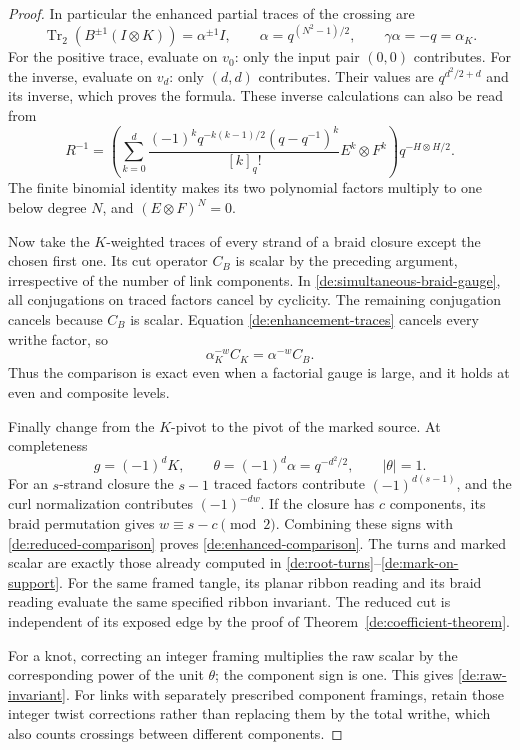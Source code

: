 \begin{proof}
In particular the enhanced partial traces of the crossing are
\begin{equation}\label{de:enhancement-traces}
 \operatorname{Tr}_2(B^{\pm1}(I\otimes K))
       =\alpha^{\pm1}I,\qquad
 \alpha=q^{(N^2-1)/2},\qquad \gamma\alpha=-q=\alpha_K.
\end{equation}
For the positive trace, evaluate on \(v_0\): only the input
pair \((0,0)\) contributes. For the inverse, evaluate on
\(v_d\): only \((d,d)\) contributes. Their values are
\(q^{d^2/2+d}\) and its inverse, which proves the formula.
These inverse calculations can also be read from
\[
 R^{-1}=
 \left(\sum_{k=0}^d
   \frac{(-1)^kq^{-k(k-1)/2}(q-q^{-1})^k}{[k]_q!}
                           E^k\otimes F^k\right)
                             q^{-H\otimes H/2}.
\]
The finite binomial identity makes its two polynomial factors
multiply to one below degree \(N\), and
\((E\otimes F)^N=0\).

Now take the \(K\)-weighted traces of every strand of a braid
closure except the chosen first one. Its cut operator \(C_B\)
is scalar by the preceding argument, irrespective of the number
of link components. In \eqref{de:simultaneous-braid-gauge},
all conjugations on traced factors cancel by cyclicity.
The remaining conjugation cancels because \(C_B\) is scalar.
Equation \eqref{de:enhancement-traces} cancels every writhe
factor, so
\begin{equation}\label{de:reduced-comparison}
                    \alpha_K^{-w}C_K=\alpha^{-w}C_B.
\end{equation}
Thus the comparison is exact even when a factorial gauge is
large, and it holds at even and composite levels.

Finally change from the \(K\)-pivot to the pivot of the marked
source. At completeness
\[
                   g=(-1)^dK,\qquad
 \theta=(-1)^d\alpha=q^{-d^2/2},\qquad |\theta|=1.
\]
For an \(s\)-strand closure the \(s-1\) traced factors contribute
\((-1)^{d(s-1)}\), and the curl normalization contributes
\((-1)^{-dw}\). If the closure has \(c\) components, its braid
permutation gives \(w\equiv s-c\pmod2\). Combining these signs
with \eqref{de:reduced-comparison} proves
\eqref{de:enhanced-comparison}. The turns and marked scalar
are exactly those already computed in
\eqref{de:root-turns}--\eqref{de:mark-on-support}.
For the same framed tangle, its planar ribbon reading and its
braid reading evaluate the same specified ribbon invariant.
The reduced cut is independent of its exposed edge by
the proof of Theorem~\ref{de:coefficient-theorem}.

For a knot, correcting an integer framing multiplies the raw
scalar by the corresponding power of the unit \(\theta\);
the component sign is one. This gives
\eqref{de:raw-invariant}. For links with separately prescribed
component framings, retain those integer twist corrections
rather than replacing them by the total writhe, which also
counts crossings between different components.
\end{proof}

